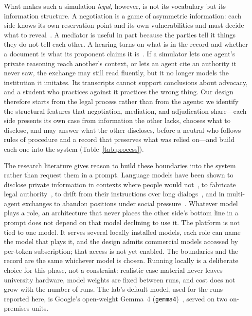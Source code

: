 \documentclass[acmsmall,screen,review]{acmart}
\newcommand{\code}[1]{\texttt{\small #1}}
\begin{document}
What makes such a simulation \emph{legal}, however, is not its vocabulary but its information structure. A negotiation is a game of asymmetric information: each side knows its own reservation point and its own vulnerabilities and must decide what to reveal~\cite{raiffa1982negotiation,mnookin2000beyond}. A mediator is useful in part because the parties tell it things they do not tell each other. A hearing turns on what is in the record and whether a document is what its proponent claims it is~\cite{fre901}. If a simulator lets one agent's private reasoning reach another's context, or lets an agent cite an authority it never saw, the exchange may still read fluently, but it no longer models the institution it imitates. Its transcripts cannot support conclusions about advocacy, and a student who practices against it practices the wrong thing. Our design therefore starts from the legal process rather than from the agents: we identify the structural features that negotiation, mediation, and adjudication share---each side presents its own case from information the other lacks, chooses what to disclose, and may answer what the other discloses, before a neutral who follows rules of procedure and a record that preserves what was relied on---and build each one into the system (Table~\ref{tab:process}).

The research literature gives reason to build these boundaries into the system rather than request them in a prompt. Language models have been shown to disclose private information in contexts where people would not~\cite{mireshghallah2024secret}, to fabricate legal authority~\cite{dahl2024fictions,magesh2025hallucination}, to drift from their instructions over long dialogs~\cite{li2024instability}, and in multi-agent exchanges to abandon positions under social pressure~\cite{yao2025peacemaker,wynn2025talk}. Whatever model plays a role, an architecture that never places the other side's bottom line in a prompt does not depend on that model declining to use it. The platform is not tied to one model. It serves several locally installed models, each role can name the model that plays it, and the design admits commercial models accessed by per-token subscription; that access is not yet enabled. The boundaries and the record are the same whichever model is chosen. Running locally is a deliberate choice for this phase, not a constraint: realistic case material never leaves university hardware, model weights are fixed between runs, and cost does not grow with the number of runs. The lab's default model, used for the runs reported here, is Google's open-weight Gemma~4 (\code{gemma4})~\cite{gemma4report}, served on two on-premises units.
\end{document}
